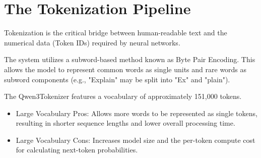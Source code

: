 ﻿\section{The Tokenization Pipeline}
\label{sec:tokenization-pipeline}


Tokenization is the critical bridge between human-readable text and the numerical data (Token IDs) required by neural networks.

The system utilizes a subword-based method known as Byte Pair Encoding. This allows the model to represent common words as single units and rare words as subword components (e.g., "Explain" may be split into "Ex" and "plain").

The Qwen3Tokenizer features a vocabulary of approximately 151,000 tokens.
\begin{itemize}
  \item Large Vocabulary Pros: Allows more words to be represented as single tokens, resulting in shorter sequence lengths and lower overall processing time.
  \item Large Vocabulary Cons: Increases model size and the per-token compute cost for calculating next-token probabilities.
\end{itemize}




